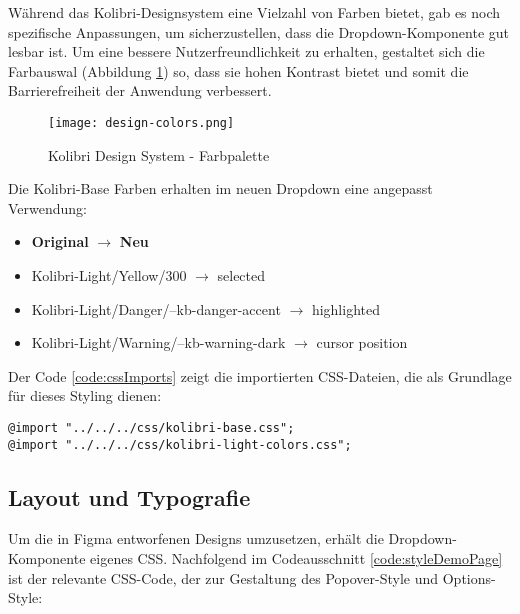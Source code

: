 Während das Kolibri-Designsystem eine Vielzahl von Farben bietet, gab es noch spezifische Anpassungen, um sicherzustellen, dass die Dropdown-Komponente gut lesbar ist.
Um eine bessere Nutzerfreundlichkeit zu erhalten, gestaltet sich die Farbauswal (Abbildung \ref{img:designColors}) so, dass sie hohen Kontrast bietet und somit die Barrierefreiheit der Anwendung verbessert.

\begin{figure}[!htb]
    \centering
    \texttt{[image: design-colors.png]}
    \caption{Kolibri Design System - Farbpalette}
    \label{img:designColors}
\end{figure}

\noindent %
Die Kolibri-Base Farben erhalten im neuen Dropdown eine angepasst Verwendung:

\begin{itemize}
    \item \textbf{Original} $\rightarrow$ \textbf{Neu}
    \item Kolibri-Light/Yellow/300 $\rightarrow$ selected
    \item Kolibri-Light/Danger/--kb-danger-accent $\rightarrow$ highlighted
    \item Kolibri-Light/Warning/--kb-warning-dark $\rightarrow$ cursor position
\end{itemize}

\noindent
Der Code \ref{code:cssImports} zeigt die importierten CSS-Dateien, die als Grundlage für dieses Styling dienen:

\begin{lstlisting}[style = htmlcssjs, caption = CSS Imports, label = code:cssImports]
@import "../../../css/kolibri-base.css";
@import "../../../css/kolibri-light-colors.css";
\end{lstlisting}


\subsection{Layout und Typografie}
\label{sec:layoutTypo}

Um die in Figma entworfenen Designs umzusetzen, erhält die Dropdown-Komponente eigenes CSS.
Nachfolgend im Codeausschnitt \ref{code:styleDemoPage} ist der relevante CSS-Code, der zur Gestaltung des Popover-Style und Options-Style:

